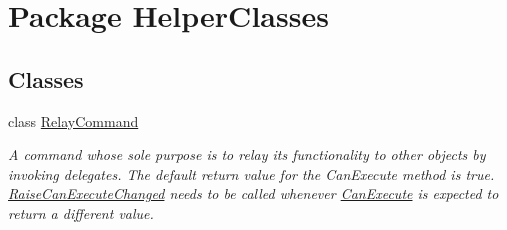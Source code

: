 \hypertarget{namespace_helper_classes}{}\section{Package Helper\+Classes}
\label{namespace_helper_classes}
\subsection*{Classes}
\begin{DoxyCompactItemize}
\item 
class \hyperlink{class_helper_classes_1_1_relay_command}{Relay\+Command}
\begin{DoxyCompactList}\small\item\em A command whose sole purpose is to relay its functionality to other objects by invoking delegates. The default return value for the Can\+Execute method is \textquotesingle{}true\textquotesingle{}. \hyperlink{class_helper_classes_1_1_relay_command_a14af980403ef90c4ee57f1395988fa8e}{Raise\+Can\+Execute\+Changed} needs to be called whenever \hyperlink{class_helper_classes_1_1_relay_command_a1e2d080059a2f0f7cd455af612d77bbe}{Can\+Execute} is expected to return a different value. \end{DoxyCompactList}\end{DoxyCompactItemize}
